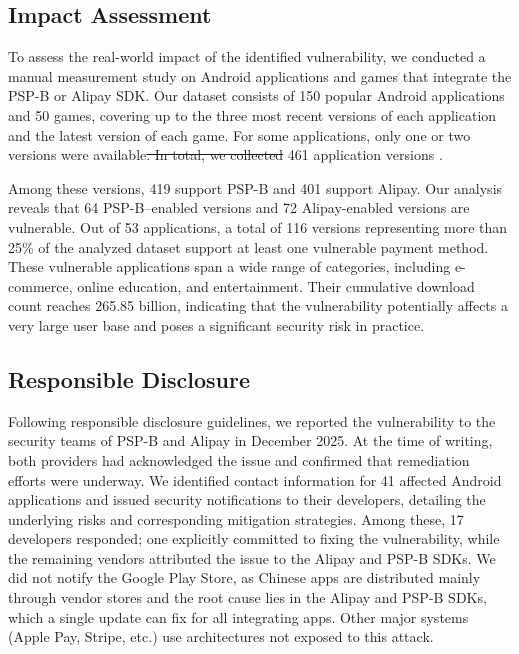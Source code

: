 \documentclass[journal]{IEEEtran}
\makeatletter
\providecommand{\DIFaddtex}[1]{{\protect\color{blue}\uwave{#1}}} %
\providecommand{\DIFdeltex}[1]{{\protect\color{red}\sout{#1}}} %
\providecommand{\DIFaddbegin}{} %
\providecommand{\DIFaddend}{} %
\providecommand{\DIFdelbegin}{} %
\providecommand{\DIFdelend}{} %
\providecommand{\DIFadd}[1]{\texorpdfstring{\DIFaddtex{#1}}{#1}} %
\providecommand{\DIFdel}[1]{\texorpdfstring{\DIFdeltex{#1}}{}} %
\providecommand{\DIFscaledelfig}{0.5}
\newlength{\DIFdelgraphicswidth} %
\newlength{\DIFdelgraphicsheight} %
\providecommand{\DIFaddincludegraphics}[2][]{{\color{blue}\fbox{\DIFOincludegraphics[#1]{#2}}}} %
\providecommand{\DIFdelincludegraphics}[2][]{%
\sbox{\DIFdelgraphicsbox}{\DIFOincludegraphics[#1]{#2}}%
\settoboxwidth{\DIFdelgraphicswidth}{\DIFdelgraphicsbox} %
\settoboxtotalheight{\DIFdelgraphicsheight}{\DIFdelgraphicsbox} %
\scalebox{\DIFscaledelfig}{%
\parbox[b]{\DIFdelgraphicswidth}{\usebox{\DIFdelgraphicsbox}\\[-\baselineskip] \rule{\DIFdelgraphicswidth}{0em}}\llap{\resizebox{\DIFdelgraphicswidth}{\DIFdelgraphicsheight}{%
\setlength{\unitlength}{\DIFdelgraphicswidth}%
\begin{picture}(1,1)%
\thicklines\linethickness{2pt} %
{\color[rgb]{1,0,0}\put(0,0){\framebox(1,1){}}}%
{\color[rgb]{1,0,0}\put(0,0){\line( 1,1){1}}}%
{\color[rgb]{1,0,0}\put(0,1){\line(1,-1){1}}}%
\end{picture}%
}\hspace*{3pt}}} %
} %
\DeclareRobustCommand{\DIFaddbegin}{\DIFOaddbegin \let\includegraphics\DIFaddincludegraphics} %
\DeclareRobustCommand{\DIFaddend}{\DIFOaddend \let\includegraphics\DIFOincludegraphics} %
\DeclareRobustCommand{\DIFdelbegin}{\DIFOdelbegin \let\includegraphics\DIFdelincludegraphics} %
\DeclareRobustCommand{\DIFdelend}{\DIFOaddend \let\includegraphics\DIFOincludegraphics} %
\let\sout@orig\sout %
\renewcommand{\sout}[1]{\ifmmode\text{\sout@orig{\ensuremath{#1}}}\else\sout@orig{#1}\fi} %
\makeatother
\begin{document}
\subsection{Impact Assessment}
To assess the real-world impact of the identified vulnerability, we conducted a manual measurement study on Android applications and games that integrate the PSP-B or Alipay SDK.
Our dataset consists of 150 popular Android applications and 50 games, covering up to the three most recent versions of each application and the latest version of each game.
For some applications, only one or two versions were available\DIFdelbegin \DIFdel{.
In total, we collected }\DIFdelend \DIFaddbegin \DIFadd{, giving }\DIFaddend 461 application versions \DIFaddbegin \DIFadd{in total}\DIFaddend .

Among these versions, 419 support PSP-B and 401 support Alipay.
Our analysis reveals that 64 PSP-B–enabled versions and 72 Alipay-enabled versions are vulnerable.
Out of 53 applications, a total of 116 versions representing more than 25\% of the analyzed dataset support at least one vulnerable payment method. 
These vulnerable applications span a wide range of categories, including e-commerce, online education, and entertainment.
Their cumulative download count reaches 265.85 billion, indicating that the vulnerability potentially affects a very large user base and poses a significant security risk in practice.

\subsection{Responsible Disclosure}
Following responsible disclosure guidelines, we reported the vulnerability to the security teams of PSP-B and Alipay in December 2025. 
At the time of writing, both providers had acknowledged the issue and confirmed that remediation efforts were underway. 
We identified contact information for 41 affected Android applications and issued security notifications to their developers, detailing the underlying risks and corresponding mitigation strategies.
Among these, 17 developers responded; one explicitly committed to fixing the vulnerability, while the remaining vendors attributed the issue to the Alipay and PSP-B SDKs.
We did not notify the Google Play Store, as Chinese apps are distributed mainly through vendor stores and the root cause lies in the Alipay and PSP-B SDKs, which a single update can fix for all integrating apps. Other major systems (Apple Pay, Stripe, etc.) use architectures not exposed to this attack.
\DIFaddbegin 
\end{document}
